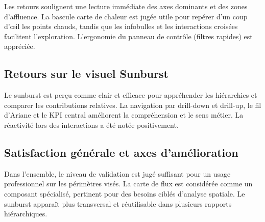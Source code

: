 Les retours soulignent une lecture immédiate des axes dominants et des zones d’affluence. La bascule carte de chaleur est jugée utile pour repérer d’un coup d’œil les points chauds, tandis que les infobulles et les interactions croisées facilitent l’exploration. L’ergonomie du panneau de contrôle (filtres rapides) est appréciée.

\subsection{Retours sur le visuel Sunburst}

Le sunburst est perçu comme clair et efficace pour appréhender les hiérarchies et comparer les contributions relatives. La navigation par drill-down et drill-up, le fil d'Ariane et le KPI central améliorent la compréhension et le sens métier. La réactivité lors des interactions a été notée positivement.


\subsection{Satisfaction générale et axes d’amélioration}

Dans l’ensemble, le niveau de validation est jugé suffisant pour un usage professionnel sur les périmètres visés. La carte de flux est considérée comme un composant spécialisé, pertinent pour des besoins ciblés d’analyse spatiale. Le sunburst apparaît plus transversal et réutilisable dans plusieurs rapports hiérarchiques.

